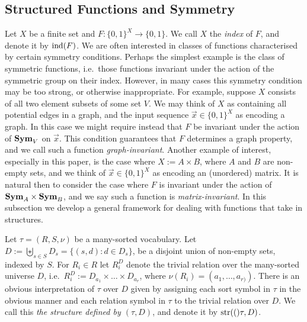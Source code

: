 \documentclass[../paper.tex]{subfiles}
\begin{document}


\subsection{Structured Functions and Symmetry}
Let $X$ be a finite set and $F: \{0,1\}^{X} \rightarrow \{0,1\}$. We call $X$
the \emph{index} of $F$, and denote it by $\text{\upshape ind}(F)$. We are often interested in
classes of functions characterised by certain symmetry conditions. Perhaps the
simplest example is the class of symmetric functions, i.e.\ those functions
invariant under the action of the symmetric group on their index. However, in
many cases this symmetry condition may be too strong, or otherwise
inappropriate. For example, suppose $X$ consists of all two element subsets of
some set $V$. We may think of $X$ as containing all potential edges in a graph,
and the input sequence $ \vec{x} \in \{0,1\}^X$ as encoding a graph. In this
case we might require instead that $F$ be invariant under the action of $\text{\textbf{Sym}}_V$
on $\vec{x}$. This condition guarantees that $F$ determines a graph property,
and we call such a function \emph{graph-invariant}. Another example of interest,
especially in this paper, is the case where $X := A \times B$, where $A$ and $B$
are non-empty sets, and we think of $\vec{x} \in \{0,1\}^X$ as encoding an
(unordered) matrix. It is natural then to consider the case where $F$ is
invariant under the action of $\text{\textbf{Sym}}_A \times \text{\textbf{Sym}}_B$, and we say such a function
is \emph{matrix-invariant}. In this subsection we develop a general framework
for dealing with functions that take in structures.

Let $\tau = (R, S, \nu)$ be a many-sorted vocabulary. Let $D := \biguplus_{s \in
  S} D_{s} = \{(s,d) : d \in D_s\}$, be a disjoint union of non-empty sets,
indexed by $S$. For $R_i \in R$ let $R^D_i$ denote the trivial relation over the
many-sorted universe $D$, i.e.\ $R^D_i := D_{a_1} \times \ldots \times
D_{a_{r}}$, where $\nu(R_i) = (a_1, \ldots , a_{r)})$. There is an obvious
interpretation of $\tau$ over $D$ given by assigning each sort symbol in $\tau$
in the obvious manner and each relation symbol in $\tau$ to the trivial relation
over $D$. We call this \emph{the structure defined by $(\tau, D)$}, and denote
it by $\text{str}(()\tau, D)$.
\end{document}
